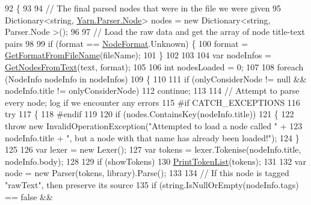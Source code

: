 \begin{DoxyCode}
92         \{
93 
94             \textcolor{comment}{// The final parsed nodes that were in the file we were given}
95             Dictionary<string, \hyperlink{a00110}{Yarn.Parser.Node}> nodes = \textcolor{keyword}{new} Dictionary<string, Parser.Node
      >();
96 
97             \textcolor{comment}{// Load the raw data and get the array of node title-text pairs}
98 
99             \textcolor{keywordflow}{if} (format == \hyperlink{a00029_ad7ebb46e7309ead8767383a672b3272f}{NodeFormat}.Unknown) \{
100                 format = \hyperlink{a00105_a080b2d6b7553c178007c04297d50e9da}{GetFormatFromFileName}(fileName);
101             \}
102 
103 
104             var nodeInfos = \hyperlink{a00105_a0aa76ba9366b44bf78198a78ea958c9c}{GetNodesFromText}(text, format);
105 
106             \textcolor{keywordtype}{int} nodesLoaded = 0;
107 
108             \textcolor{keywordflow}{foreach} (NodeInfo nodeInfo \textcolor{keywordflow}{in} nodeInfos)
109             \{
110 
111                 \textcolor{keywordflow}{if} (onlyConsiderNode != null && nodeInfo.title != onlyConsiderNode)
112                     \textcolor{keywordflow}{continue};
113 
114                 \textcolor{comment}{// Attempt to parse every node; log if we encounter any errors}
115 \textcolor{preprocessor}{#if CATCH\_EXCEPTIONS}
116 \textcolor{preprocessor}{}                \textcolor{keywordflow}{try}
117                 \{
118 \textcolor{preprocessor}{#endif}
119 \textcolor{preprocessor}{}
120                     \textcolor{keywordflow}{if} (nodes.ContainsKey(nodeInfo.title))
121                     \{
122                         \textcolor{keywordflow}{throw} \textcolor{keyword}{new} InvalidOperationException(\textcolor{stringliteral}{"Attempted to load a node called "} +
123                             nodeInfo.title + \textcolor{stringliteral}{", but a node with that name has already been loaded!"});
124                     \}
125 
126                     var lexer = \textcolor{keyword}{new} Lexer();
127                     var tokens = lexer.Tokenise(nodeInfo.title, nodeInfo.body);
128 
129                     \textcolor{keywordflow}{if} (showTokens)
130                         \hyperlink{a00105_a9321fce224021841ce6f70ca7fbe531b}{PrintTokenList}(tokens);
131 
132                     var node = \textcolor{keyword}{new} Parser(tokens, library).Parse();
133 
134                     \textcolor{comment}{// If this node is tagged "rawText", then preserve its source}
135                     \textcolor{keywordflow}{if} (\textcolor{keywordtype}{string}.IsNullOrEmpty(nodeInfo.tags) == \textcolor{keyword}{false} &&

\end{DoxyCode}
